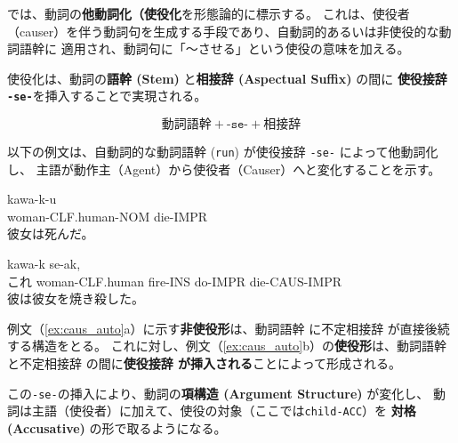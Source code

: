 \langname では、動詞の\textbf{他動詞化（使役化}を形態論的に標示する。
これは、使役者（causer）を伴う動詞句を生成する手段であり、自動詞的あるいは非使役的な動詞語幹に
適用され、動詞句に「〜させる」という使役の意味を加える。

使役化は、動詞の\textbf{語幹 (Stem)} と\textbf{相接辞 (Aspectual Suffix)} の間に
\textbf{使役接辞 \texttt{-se-}}を挿入することで実現される。

$$ \text{動詞語幹} + \texttt{-se-} + \text{相接辞} $$

以下の例文は、自動詞的な動詞語幹 (\texttt{run}) が使役接辞 \texttt{-se-} によって他動詞化し、
主語が動作主（Agent）から使役者（Causer）へと変化することを示す。

\begin{exe}
        \ex \gll kawa-k-u \\
        woman-CLF.human-NOM die-IMPR\\
        \glt 彼女は死んだ。
\end{exe}
\begin{exe}
        \ex \gll {} kawa-k  se-ak,  \\
        これ woman-CLF.human fire-INS do-IMPR die-CAUS-IMPR \\
        \glt 彼は彼女を焼き殺した。
\end{exe}

例文（\ref{ex:caus_auto}a）に示す\textbf{非使役形}は、動詞語幹  に不定相接辞
  が直接後続する構造をとる。
 これに対し、例文（\ref{ex:caus_auto}b）の\textbf{使役形}は、動詞語幹  と不定相接辞
   の間に\textbf{使役接辞  が挿入される}ことによって形成される。

この\texttt{-se-}の挿入により、動詞の\textbf{項構造 (Argument Structure)} が変化し、
動詞は主語（使役者）に加えて、使役の対象（ここでは\texttt{child-ACC}）を
\textbf{対格 (Accusative)} の形で取るようになる。